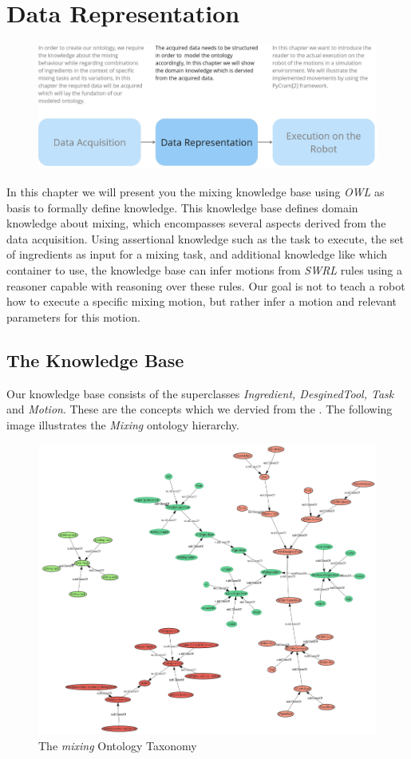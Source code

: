 \chapter{Data Representation}
\label{chap:Data_representation}
\begin{figure}[H]
    \includegraphics[scale=0.25]{Graphics/structure_overview2.jpg}
\end{figure} 
In this chapter we will present you the mixing knowledge base using \textit{OWL} as basis to formally define knowledge.
This knowledge base defines domain knowledge about mixing, which encompasses several aspects derived from the data acquisition.
Using assertional knowledge such as the task to execute, the set of ingredients as input for a mixing task, 
and additional knowledge like which container to use, the knowledge base can infer motions from \textit{SWRL} rules using a reasoner capable 
with reasoning over these rules.
Our goal is not to teach a robot how to execute a specific mixing motion, but rather infer a motion and relevant parameters for this motion. 
\newpage
\section{The Knowledge Base}
Our knowledge base consists of the superclasses \textit{Ingredient, DesginedTool, Task} and \textit{Motion}. These are the concepts which we dervied from the . The following image illustrates the \textit{Mixing} ontology hierarchy.
\begin{figure}[H]
    \includegraphics[scale=0.5]{Graphics/classHierarchy/taxonomy.png}
    \centering
    \caption{The \textit{mixing} Ontology Taxonomy}
\end{figure}

